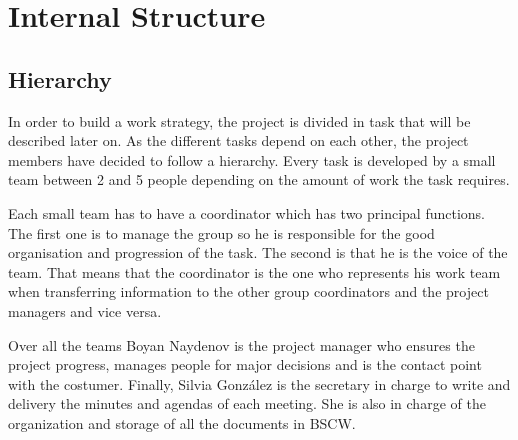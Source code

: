 \section{Internal Structure}


\subsection{Hierarchy}

In order to build a work strategy, the project is divided in task that will be described later on. As the different tasks depend on each other, the project members have decided to follow a hierarchy. Every task is developed by a small team between 2 and 5 people depending on the amount of work the task requires.
\newline

Each small team has to have a coordinator which has two principal functions. The first one is to manage the group so he is responsible for the good organisation and progression of the task. The second is that he is the voice of the team. That means that the coordinator is the one who represents his work team when transferring information to the other group coordinators and the project managers and vice versa.
\newline

Over all the teams Boyan Naydenov is the project manager who ensures the project progress, manages people for major decisions and is the contact point with the costumer. Finally, Silvia Gonz\'{a}lez is the secretary in charge to write and delivery the minutes and agendas of each meeting. She is also in charge of the organization and storage of all the documents in BSCW. \newline
 
